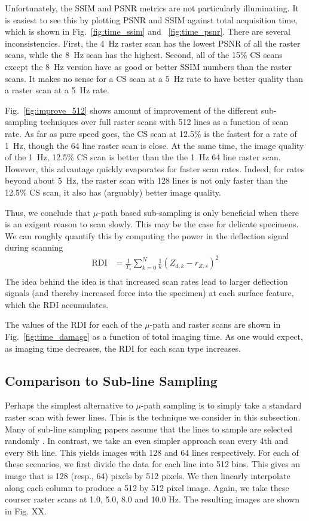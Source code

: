 \documentclass[twocolumn,oneside]{IEEEtran/IEEEtran}
\begin{document}
Unfortunately, the SSIM and PSNR metrics are not particularly illuminating. It
is easiest to see this by plotting PSNR and SSIM against total acquisition time,
which is shown in Fig.~\ref{fig:time_ssim} and ~\ref{fig:time_psnr}. There are several
inconsistencies. First, the 4~Hz raster scan has the lowest PSNR of all the
raster scans, while the 8~Hz scan has the highest. Second, all of the 15\% CS
scans except the 8~Hz version have as good or better SSIM numbers than the
raster scans. It makes no sense for a CS scan at a 5~Hz rate to have better
quality than a raster scan at a 5~Hz rate.

Fig.~\ref{fig:improve_512} shows amount of improvement of the different sub-sampling techniques over full raster scans with 512 lines as a function of scan rate. As far as pure speed goes, the CS scan at 12.5\% is the fastest for a rate of 1~Hz, though the 64 line raster scan is close. At the same time, the image quality of the 1~Hz, 12.5\% CS scan is better than the the 1~Hz 64 line raster scan. However, this advantage quickly evaporates for faster scan rates. Indeed, for rates beyond about 5~Hz, the raster scan with 128 lines is not only faster than the 12.5\% CS scan, it also has (arguably) better image quality.

Thus, we conclude that $\mu$-path based sub-sampling is only beneficial when there is an exigent reason to scan slowly. This may be the case for delicate specimens. We can roughly quantify this by computing the power in the deflection signal during scanning
\begin{align}
  \text{RDI} &= \frac{1}{T_s}\sum_{k=0}^N \frac{1}{k} \left(Z_{d,k} - r_{Z,s}\right)^2 \label{eqn:RDI}\\
\end{align}
The idea behind the idea is that increased scan rates lead to larger deflection signals (and thereby increased force into the specimen) at each surface feature, which the RDI accumulates.

The values of the RDI for each of the $\mu$-path and raster scans are shown in Fig.~\ref{fig:time_damage} as a function of total imaging time. As one would expect, as imaging time decreases, the RDI for each scan type increases.

\subsection{Comparison to Sub-line Sampling}
Perhaps the simplest alternative to $\mu$-path sampling is to simply take a standard raster scan with fewer lines. This is the technique we consider in this subsection. Many of sub-line sampling papers assume that the lines to sample are selected randomly \cite{han_optimal_2018, Luo_nano_2015}. In contrast, we take an even simpler approach scan every 4th and every 8th line. This yields images with 128 and 64 lines respectively. For each of these scenarios, we first divide the data for each line into 512 bins. This gives an image that is 128 (resp., 64) pixels by 512 pixels. We then linearly interpolate along each column to produce a 512 by 512 pixel image. Again, we take these courser raster scans at 1.0, 5.0, 8.0 and 10.0 Hz. The resulting images are shown in Fig. XX.
\end{document}

